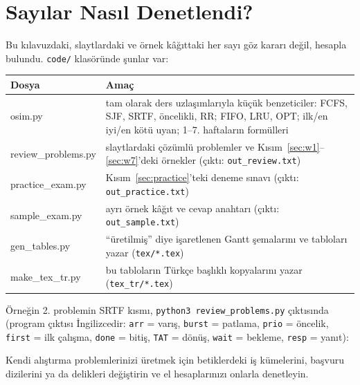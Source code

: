 \documentclass[11pt,a4paper]{article}
\newcommand{\cmd}[1]{\texttt{#1}}
\begin{document}
\section{Sayılar Nasıl Denetlendi?}
\label{sec:check}
Bu kılavuzdaki, slaytlardaki ve örnek kâğıttaki her sayı göz kararı değil, hesapla bulundu. \texttt{code/} klasöründe şunlar var:
\begin{center}
\renewcommand{\arraystretch}{1.2}
\begin{tabularx}{\linewidth}{@{}>{\ttfamily}l X@{}}
\toprule
\textrm{\textbf{Dosya}} & \textbf{Amaç} \\
\midrule
osim.py & tam olarak ders uzlaşımlarıyla küçük benzeticiler: FCFS, SJF, SRTF, öncelikli, RR; FIFO, LRU, OPT; ilk/en iyi/en kötü uyan; 1--7. haftaların formülleri \\
review\_problems.py & slaytlardaki çözümlü problemler ve Kısım~\ref{sec:w1}--\ref{sec:w7}'deki örnekler (çıktı: \texttt{out\_review.txt}) \\
practice\_exam.py & Kısım~\ref{sec:practice}'teki deneme sınavı (çıktı: \texttt{out\_practice.txt}) \\
sample\_exam.py & ayrı örnek kâğıt ve cevap anahtarı (çıktı: \texttt{out\_sample.txt}) \\
gen\_tables.py & ``üretilmiş'' diye işaretlenen Gantt şemalarını ve tabloları yazar (\texttt{tex/*.tex}) \\
make\_tex\_tr.py & bu tabloların Türkçe başlıklı kopyalarını yazar (\texttt{tex\_tr/*.tex}) \\
\bottomrule
\end{tabularx}
\end{center}
Örneğin 2. problemin SRTF kısmı, \cmd{python3 review\_problems.py} çıktısında (program çıktısı İngilizcedir: \texttt{arr} = varış, \texttt{burst} = patlama, \texttt{prio} = öncelik, \texttt{first} = ilk çalışma, \texttt{done} = bitiş, \texttt{TAT} = dönüş, \texttt{wait} = bekleme, \texttt{resp} = yanıt):

Kendi alıştırma problemlerinizi üretmek için betiklerdeki iş kümelerini, başvuru dizilerini ya da delikleri değiştirin ve el hesaplarınızı onlarla denetleyin.

\end{document}
